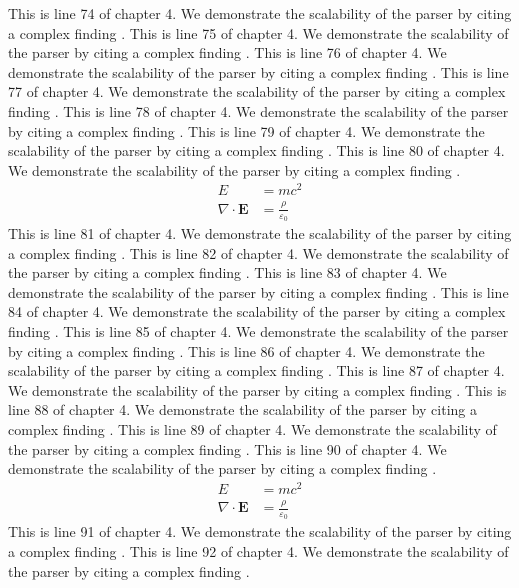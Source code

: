 This is line 74 of chapter 4. We demonstrate the scalability of the parser by citing a complex finding \cite{ref4_74}.
This is line 75 of chapter 4. We demonstrate the scalability of the parser by citing a complex finding \cite{ref4_75}.
This is line 76 of chapter 4. We demonstrate the scalability of the parser by citing a complex finding \cite{ref4_76}.
This is line 77 of chapter 4. We demonstrate the scalability of the parser by citing a complex finding \cite{ref4_77}.
This is line 78 of chapter 4. We demonstrate the scalability of the parser by citing a complex finding \cite{ref4_78}.
This is line 79 of chapter 4. We demonstrate the scalability of the parser by citing a complex finding \cite{ref4_79}.
This is line 80 of chapter 4. We demonstrate the scalability of the parser by citing a complex finding \cite{ref4_80}.
\begin{align*}
  E &= mc^2 \\
  \nabla \cdot \mathbf{E} &= \frac{\rho}{\varepsilon_0}
\end{align*}
This is line 81 of chapter 4. We demonstrate the scalability of the parser by citing a complex finding \cite{ref4_81}.
This is line 82 of chapter 4. We demonstrate the scalability of the parser by citing a complex finding \cite{ref4_82}.
This is line 83 of chapter 4. We demonstrate the scalability of the parser by citing a complex finding \cite{ref4_83}.
This is line 84 of chapter 4. We demonstrate the scalability of the parser by citing a complex finding \cite{ref4_84}.
This is line 85 of chapter 4. We demonstrate the scalability of the parser by citing a complex finding \cite{ref4_85}.
This is line 86 of chapter 4. We demonstrate the scalability of the parser by citing a complex finding \cite{ref4_86}.
This is line 87 of chapter 4. We demonstrate the scalability of the parser by citing a complex finding \cite{ref4_87}.
This is line 88 of chapter 4. We demonstrate the scalability of the parser by citing a complex finding \cite{ref4_88}.
This is line 89 of chapter 4. We demonstrate the scalability of the parser by citing a complex finding \cite{ref4_89}.
This is line 90 of chapter 4. We demonstrate the scalability of the parser by citing a complex finding \cite{ref4_90}.
\begin{align*}
  E &= mc^2 \\
  \nabla \cdot \mathbf{E} &= \frac{\rho}{\varepsilon_0}
\end{align*}
This is line 91 of chapter 4. We demonstrate the scalability of the parser by citing a complex finding \cite{ref4_91}.
This is line 92 of chapter 4. We demonstrate the scalability of the parser by citing a complex finding \cite{ref4_92}.
